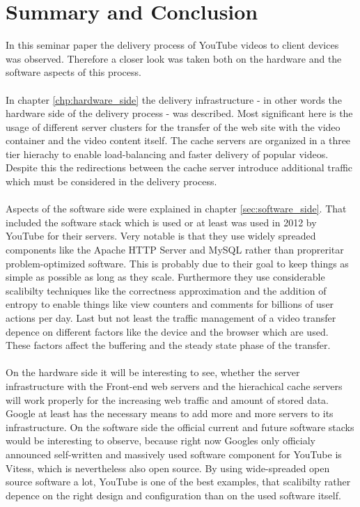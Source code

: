 \section{Summary and Conclusion}

In this seminar paper the delivery process of YouTube videos to client devices was observed. Therefore a closer look was taken both on the hardware and the software aspects of this process. \\
\\
In chapter \ref{chp:hardware_side} the delivery infrastructure - in other words the hardware side of the delivery process - was described. Most significant here is the usage of different server clusters for the transfer of the web site with the video container and the video content itself. The cache servers are organized in a three tier hierachy to enable load-balancing and faster delivery of popular videos. Despite this the redirections between the cache server introduce additional traffic which must be considered in the delivery process.\\
\\
Aspects of the software side were explained in chapter \ref{sec:software_side}. That included the software stack which is used or at least was used in 2012 by YouTube for their servers. Very notable is that they use widely spreaded components like the Apache HTTP Server and MySQL rather than propreritar problem-optimized software. This is probably due to their goal to keep things as simple as possible as long as they scale. Furthermore they use considerable scalibilty techniques like the correctness approximation and the addition of entropy to enable things like view counters and comments for billions of user actions per day. Last but not least the traffic management of a video transfer depence on different factors like the device and the browser which are used. These factors affect the buffering and the steady state phase of the transfer.\\
\\
On the hardware side it will be interesting to see, whether the server infrastructure with the Front-end web servers and the hierachical cache servers will work properly for the increasing web traffic and amount of stored data. Google at least has the necessary means to add more and more servers to its infrastructure. On the software side the official current and future software stacks would be interesting to observe, because right now Googles only officialy announced self-written and massively used software component for YouTube is Vitess, which is nevertheless also open source. By using wide-spreaded open source software a lot, YouTube is one of the best examples, that scalibilty rather depence on the right design and configuration than on the used software itself.
